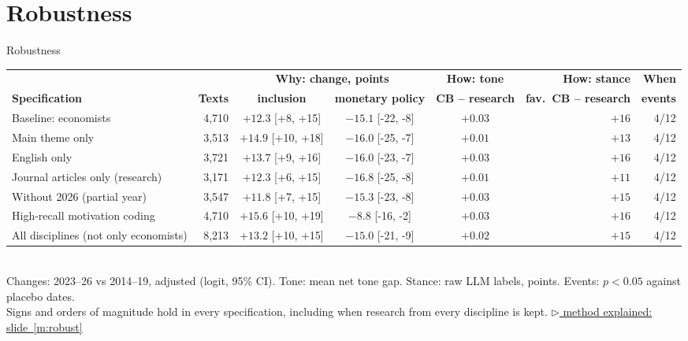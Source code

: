 \documentclass[aspectratio=169,10pt]{beamer}
\newcommand{\method}[1]{\hfill\hyperref[#1]{\tiny\textcolor{c4}{$\triangleright$ method explained: slide~\ref*{#1}}}}
\begin{document}
\section{Robustness}

\begin{frame}{Robustness}
\scriptsize
\setlength{\tabcolsep}{4pt}
\begin{tabular}{@{}lrcccrr@{}}\toprule
 & & \multicolumn{2}{c}{\textbf{Why: change, points}} & \textbf{How: tone} & \textbf{How: stance} & \textbf{When}\\
\textbf{Specification} & \textbf{Texts} & \textbf{inclusion} & \textbf{monetary policy} & \textbf{CB -- research} & \textbf{fav.\ CB -- research} & \textbf{events}\\\midrule
Baseline: economists & 4,710 & $+12.3$ \tiny[+8, +15] & $-15.1$ \tiny[-22, -8] & $+0.03$ & $+16$ & 4/12 \\
Main theme only & 3,513 & $+14.9$ \tiny[+10, +18] & $-16.0$ \tiny[-25, -7] & $+0.01$ & $+13$ & 4/12 \\
English only & 3,721 & $+13.7$ \tiny[+9, +16] & $-16.0$ \tiny[-23, -7] & $+0.03$ & $+16$ & 4/12 \\
Journal articles only (research) & 3,171 & $+12.3$ \tiny[+6, +15] & $-16.8$ \tiny[-25, -8] & $+0.01$ & $+11$ & 4/12 \\
Without 2026 (partial year) & 3,547 & $+11.8$ \tiny[+7, +15] & $-15.3$ \tiny[-23, -8] & $+0.03$ & $+15$ & 4/12 \\
High-recall motivation coding & 4,710 & $+15.6$ \tiny[+10, +19] & $-8.8$ \tiny[-16, -2] & $+0.03$ & $+16$ & 4/12 \\
All disciplines (not only economists) & 8,213 & $+13.2$ \tiny[+10, +15] & $-15.0$ \tiny[-21, -9] & $+0.02$ & $+15$ & 4/12 \\
\bottomrule\end{tabular}\\[4pt]
Changes: 2023--26 vs 2014--19, adjusted (logit, 95\% CI). Tone: mean net tone gap. Stance: raw LLM labels, points. Events: $p < 0.05$ against placebo dates.\\[3pt]
\small Signs and orders of magnitude hold in every specification, including when research from every discipline is kept.
\method{m:robust}
\end{frame}
\end{document}
